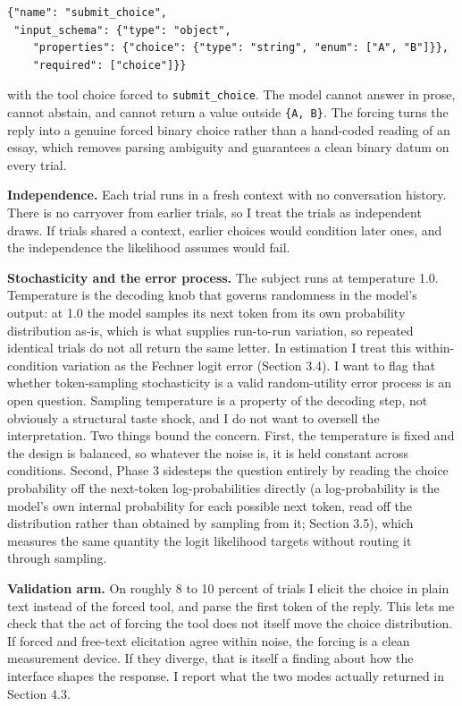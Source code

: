 \documentclass[11pt]{article}
\begin{document}
\begin{lstlisting}[style=schema]
{"name": "submit_choice",
 "input_schema": {"type": "object",
    "properties": {"choice": {"type": "string", "enum": ["A", "B"]}},
    "required": ["choice"]}}
\end{lstlisting}

with the tool choice forced to \texttt{submit\_choice}. The model cannot answer in prose, cannot abstain,
and cannot return a value outside \texttt{\{A, B\}}. The forcing turns the reply into a genuine forced
binary choice rather than a hand-coded reading of an essay, which removes parsing ambiguity and guarantees
a clean binary datum on every trial.

\textbf{Independence.} Each trial runs in a fresh context with no conversation history. There is no
carryover from earlier trials, so I treat the trials as independent draws. If
trials shared a context, earlier choices would condition later ones, and the independence the likelihood
assumes would fail.

\textbf{Stochasticity and the error process.} The subject runs at temperature 1.0. Temperature is the
decoding knob that governs randomness in the model's output: at 1.0 the model samples its next token from
its own probability distribution as-is, which is what supplies run-to-run variation, so repeated identical
trials do not all return the same letter. In estimation I treat this within-condition variation as the
Fechner logit error (Section 3.4). I want to flag that whether
token-sampling stochasticity is a valid random-utility error process is an open question. Sampling
temperature is a property of the decoding step, not obviously a structural taste shock, and I do not want
to oversell the interpretation. Two things bound the concern. First, the temperature is fixed and the
design is balanced, so whatever the noise is, it is held constant across conditions. Second, Phase 3
sidesteps the question entirely by reading the choice probability off the next-token log-probabilities
directly (a log-probability is the model's own internal probability for each possible next token, read off
the distribution rather than obtained by sampling from it; Section 3.5), which measures the same quantity
the logit likelihood targets without routing it through sampling.

\textbf{Validation arm.} On roughly 8 to 10 percent of trials I elicit the choice in plain text instead
of the forced tool, and parse the first token of the reply. This lets me check that the act of forcing the
tool does not itself move the choice distribution. If forced and free-text elicitation agree within noise,
the forcing is a clean measurement device. If they diverge, that is itself a finding about how the
interface shapes the response. I report what the two
modes actually returned in Section 4.3.
\end{document}
